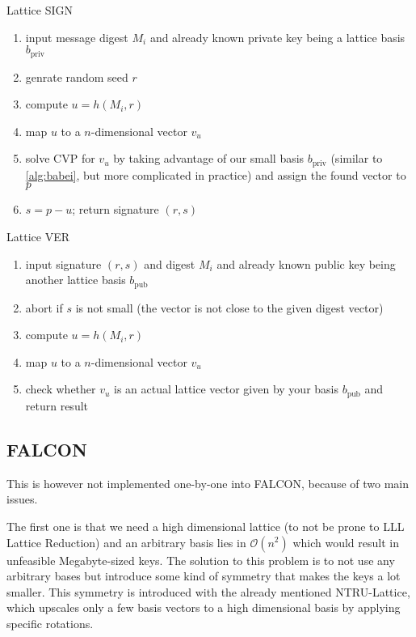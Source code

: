 \documentclass[conference]{IEEEtran}
\begin{document}
\begin{algorithm}
    \caption{Lattice SIGN}\label{alg:lattice sign v1}
        \begin{enumerate}
            \item input message digest $M_i$ and already known private key being a lattice basis $b_\text{priv}$
            \item genrate random seed $r$
            \item compute $u=h(M_i,r)$
            \item map $u$ to a $n$-dimensional vector $v_u$
            \item solve CVP for $v_u$ by taking advantage of our small basis $b_\text{priv}$ (similar to \ref{alg:babei}, but more complicated in practice) and assign the found vector to $p$
            \item $s=p-u$; return signature $(r,s)$
        \end{enumerate}
    \end{algorithm}

\begin{algorithm}
    \caption{Lattice VER}\label{alg:lattice ver v1}
        \begin{enumerate}
            \item input signature $(r,s)$ and digest $M_i$ and already known public key being another lattice basis $b_\text{pub}$
            \item abort if $s$ is not small (the vector is not close to the given digest vector)
            \item compute $u=h(M_i,r)$
            \item map $u$ to a $n$-dimensional vector $v_u$
            \item check whether $v_u$ is an actual lattice vector given by your basis $b_\text{pub}$ and return result
        \end{enumerate}
    \end{algorithm}

\subsection{FALCON}

This is however not implemented one-by-one into FALCON, because of two main issues.

The first one is that we need a high dimensional lattice (to not be prone to LLL Lattice Reduction) and an arbitrary basis lies in $\mathcal{O}(n^2)$ which would result in unfeasible Megabyte-sized keys.
The solution to this problem is to not use any arbitrary bases but introduce some kind of symmetry that makes the keys a lot smaller. This symmetry is introduced with the already mentioned NTRU-Lattice, which upscales only a few basis vectors to a high dimensional basis by applying specific rotations.
\end{document}
